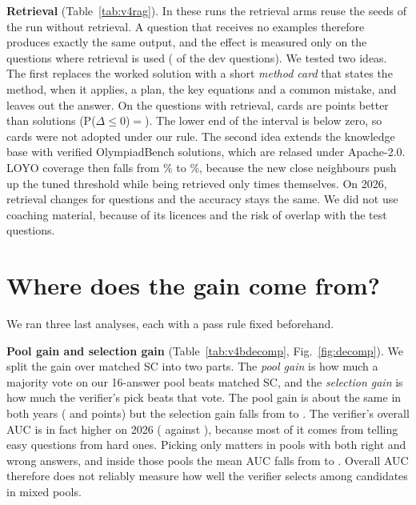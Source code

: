 \documentclass[conference]{IEEEtran}
\begin{document}
\textbf{Retrieval} (Table~\ref{tab:v4rag}). In these runs the retrieval arms reuse the seeds of the
run without retrieval. A question that receives no examples therefore produces exactly the same
output, and the effect is measured only on the questions where retrieval is used (\VfFired{} of
the \VfDevQ{} dev questions). We tested two ideas. The first replaces the worked solution with a
short \emph{method card} that states the method, when it applies, a plan, the key equations and a
common mistake, and leaves out the answer. On the questions with retrieval, cards are \VfCardSol{}
points better than solutions (P($\Delta{\le}0$)${=}$\VfCardSolP). The lower end of the interval is
below zero, so cards were not adopted under our rule. The second idea extends the knowledge base
with \VfOlyEntries{} verified OlympiadBench solutions, which are relased under Apache-2.0. LOYO
coverage then falls from \VfCovThree\% to \VfCovFour\%, because the new close neighbours push up
the tuned threshold while being retrieved only \VfOlyHits{} times themselves. On 2026, retrieval
changes for \VfKbChanged{} questions and the accuracy stays the same. We did not use coaching
material, because of its licences and the risk of overlap with the test questions.

\section{Where does the gain come from?}\label{sec:diag}
We ran three last analyses, each with a pass rule fixed beforehand.



\textbf{Pool gain and selection gain} (Table~\ref{tab:v4bdecomp}, Fig.~\ref{fig:decomp}). We
split the gain over matched SC into two parts. The \emph{pool gain} is how much a majority vote
on our 16-answer pool beats matched SC, and the \emph{selection gain} is how much the verifier's
pick beats that vote. The pool gain is about the same in both years (\VbPoolTwentyFive{} and \VbPoolTwentySix{} points) but the selection gain falls from \VbSelTwentyFive{} to
\VbSelTwentySix. The verifier's overall AUC is in fact higher on 2026 (\VbAucAllTwentySix{}
against \VbAucAllTwentyFive), because most of it comes from telling easy questions from hard
ones. Picking only matters in pools with both right and wrong answers, and inside those pools the
mean AUC falls from \VbAucInTwentyFive{} to \VbAucInTwentySix. Overall AUC therefore does not reliably measure how well the verifier selects among candidates in mixed pools.
\end{document}
